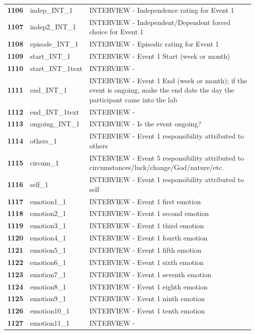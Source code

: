 \documentclass[
  letterpaper,
  DIV=11,
  numbers=noendperiod]{scrartcl}
\begin{document}
\begin{longtable}[t]{>{}cll}
\addlinespace
\textbf{1106} & indep\_INT\_1 & INTERVIEW - Independence rating for Event 1\\
\textbf{1107} & indep2\_INT\_1 & INTERVIEW - Independent/Dependent forced choice for Event 1\\
\textbf{1108} & episode\_INT\_1 & INTERVIEW - Episodic rating for Event 1\\
\textbf{1109} & start\_INT\_1 & INTERVIEW - Event 1 Start (week or month)\\
\textbf{1110} & start\_INT\_1text & INTERVIEW -\\
\addlinespace
\textbf{1111} & end\_INT\_1 & INTERVIEW - Event 1 End (week or month); if the event is ongoing, make the end date the day the participant came into the lab\\
\textbf{1112} & end\_INT\_1text & INTERVIEW -\\
\textbf{1113} & ongoing\_INT\_1 & INTERVIEW - Is the event ongoing?\\
\textbf{1114} & others\_1 & INTERVIEW - Event 1 responsibility attributed to others\\
\textbf{1115} & circum\_1 & INTERVIEW - Event 5 responsibility attributed to circumstances/luck/change/God/nature/etc.\\
\addlinespace
\textbf{1116} & self\_1 & INTERVIEW - Event 1 responsibility attributed to self\\
\textbf{1117} & emotion1\_1 & INTERVIEW - Event 1 first emotion\\
\textbf{1118} & emotion2\_1 & INTERVIEW - Event 1 second emotion\\
\textbf{1119} & emotion3\_1 & INTERVIEW - Event 1 third emotion\\
\textbf{1120} & emotion4\_1 & INTERVIEW - Event 1 fourth emotion\\
\addlinespace
\textbf{1121} & emotion5\_1 & INTERVIEW - Event 1 fifth emotion\\
\textbf{1122} & emotion6\_1 & INTERVIEW - Event 1 sixth emotion\\
\textbf{1123} & emotion7\_1 & INTERVIEW - Event 1 seventh emotion\\
\textbf{1124} & emotion8\_1 & INTERVIEW - Event 1 eighth emotion\\
\textbf{1125} & emotion9\_1 & INTERVIEW - Event 1 ninth emotion\\
\addlinespace
\textbf{1126} & emotion10\_1 & INTERVIEW - Event 1 tenth emotion\\
\textbf{1127} & emotion11\_1 & INTERVIEW -\\

\end{longtable}
\end{document}
